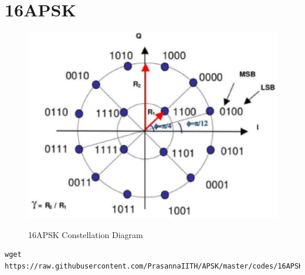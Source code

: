 \documentclass[journal,12pt,twocolumn]{IEEEtran}
\begin{document}
\section{16APSK}
\begin{figure}[h!]
\centering
\includegraphics[scale=0.4]{figs/16APSK.eps}
\label{16APSK Constellation Diagram}
\caption{16APSK Constellation Diagram}
\end{figure}

\begin{lstlisting}
wget https://raw.githubusercontent.com/PrasannaIITH/APSK/master/codes/16APSK.py
\end{lstlisting}
\end{document}
